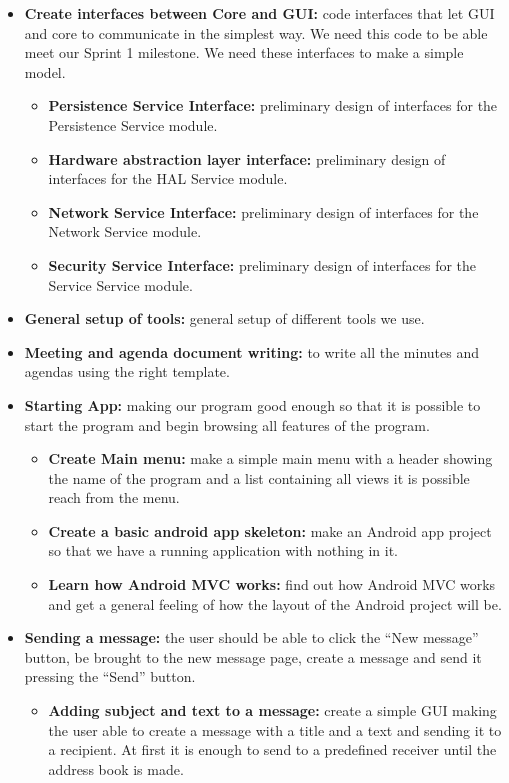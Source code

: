 \begin{itemize}
\begin{itemize}
\end{itemize}
\item{}\textbf{Create interfaces between Core and GUI:} code interfaces that let GUI and core to communicate in the simplest way. We need this code to be able meet our Sprint 1 milestone. We need these interfaces to make a simple model.
\begin{itemize}
\item{}\textbf{Persistence Service Interface:} preliminary design of interfaces for the Persistence Service module.
\item{}\textbf{Hardware abstraction layer interface:} preliminary design of interfaces for the HAL Service module.
\item{}\textbf{Network Service Interface:} preliminary design of interfaces for the Network Service module.
\item{}\textbf{Security Service Interface:} preliminary design of interfaces for the Service Service module.
\end{itemize}
\item{}\textbf{General setup of tools:} general setup of different tools we use.
\item{}\textbf{Meeting and agenda document writing:} to write all the minutes and agendas using the right template.
\item{}\textbf{Starting App:} making our program good enough so that it is possible to start the program and begin browsing all features of the program.
\begin{itemize}
\item{}\textbf{Create Main menu:} make a simple main menu with a header showing the name of the program and a list containing all views it is possible reach from the menu.
\item{}\textbf{Create a basic android app skeleton:} make an Android app project so that we have a running application with nothing in it.
\item{}\textbf{Learn how Android MVC works:} find out how Android MVC works and get a general feeling of how the layout of the Android project will be.
\end{itemize}
\item{}\textbf{Sending a message:} the user should be able to click the “New message” button, be brought to the new message page, create a message and send it pressing the “Send” button.
\begin{itemize}
\item{}\textbf{Adding subject and text to a message:} create a simple GUI making the user able to create a message with a title and a text and sending it to a recipient. At first it is enough to send to a predefined receiver until the address book is made.

\end{itemize}
\end{itemize}
